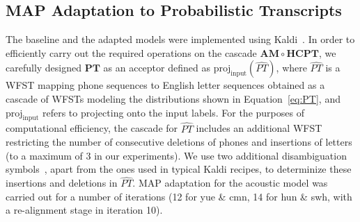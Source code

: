 \subsection{MAP Adaptation to Probabilistic Transcripts}
\label{sec:ptadapt}

The baseline and the adapted models were implemented using
Kaldi~\cite{Kaldi2011}. In order to efficiently carry out the required
operations on the cascade $\mathbf{AM}\circ\mathbf{HC}\mathbf{PT}$, we
carefully designed $\mathbf{PT}$ as an acceptor defined as
$\mathrm{proj}_{\mathrm{input}} (\widehat{PT})$, where $\widehat{PT}$
is a WFST mapping phone sequences to English letter sequences obtained
as a cascade of WFSTs modeling the distributions shown in
Equation~\ref{eq:PT}, and $\mathrm{proj}_{\mathrm{input}}$ refers to
projecting onto the input labels. For the purposes of computational
efficiency, the cascade for $\widehat{PT}$ includes an additional WFST
restricting the number of consecutive deletions of phones and
insertions of letters (to a maximum of 3 in our experiments). We use
two additional disambiguation symbols~\cite{mohri2008speech}, apart
from the ones used in typical Kaldi recipes, to determinize these
insertions and deletions in $\widehat{PT}$. MAP adaptation for the
acoustic model was carried out for a number of iterations (12 for yue
\& cmn, 14 for hun \& swh, with a re-alignment stage in iteration 10).

